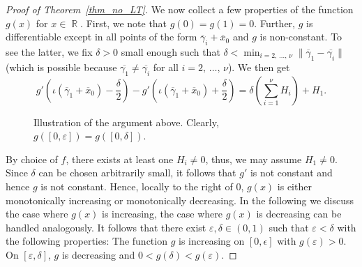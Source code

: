 \documentclass[10pt,a4paper]{amsart}
\numberwithin{equation}{section}
\DeclareMathOperator{\R}{\mathbb{R}}
\theoremstyle{definition}
\begin{document}
\begin{proof}[Proof of Theorem~\ref{thm_no_LT}]
We now collect a few properties of the function $g(x)$ for $x \in \R$. First, we note that $g(0)=g(1) = 0$. Further, $g$ is differentiable except in all points of the form $ \overline{\gamma}_i+ \overline{x}_0$ and $g$ is non-constant. To see the latter, we fix $ \delta > 0$ small enough such that $ \delta < \min_{i=2, \,\ldots,\,\nu} \| \overline{\gamma}_1- \overline{\gamma_i} \|$ (which is possible because $\overline{\gamma_1} \neq \overline{\gamma_i}$ for all $i = 2,\,\ldots,\,\nu$). We then get
\begin{equation*}
g'\left (\iota(\overline{\gamma}_1 + \overline{x}_0) - \frac{\delta}{2} \right) - g'\left (\iota(\overline{\gamma}_1 + \overline{x}_0) + \frac{\delta}{2} \right) = \delta \left(\sum_{i=1}^{\nu} H_i \right) +H_1.
\end{equation*}
\begin{figure}[!htbp]
\centering
{}
\captionsetup{labelformat=empty}
\caption{Illustration of the argument above. Clearly, $g([0,\varepsilon]) = g([0,\delta])$.}\label{fig:einplot}
\end{figure}

\noindent By choice of $f$, there exists at least one $H_i \neq 0$, thus, we may assume $H_1 \neq 0$. Since $\delta$ can be chosen arbitrarily small, it follows that $g'$ is not constant and hence $g$ is not constant. Hence, locally to the right of $0$, $g(x)$ is either monotonically increasing or monotonically decreasing. In the following we discuss the case where $g(x)$ is increasing, the case where $g(x)$ is decreasing can be handled analogously. It follows that there exist $\varepsilon, \delta \in (0,1)$ such that $ \varepsilon < \delta$ with the following properties: The function $g$ is increasing on $[0, \epsilon]$ with $g (\varepsilon) > 0$. On $[\varepsilon, \delta]$, $g$ is decreasing and $ 0 < g(\delta) < g(\varepsilon)$.




\end{proof}
\end{document}

